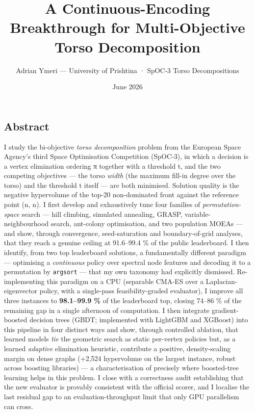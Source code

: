 \documentclass[
  11pt,
]{article}
\title{A Continuous-Encoding Breakthrough for Multi-Objective Torso
Decomposition}
\author{Adrian Ymeri --- University of Prishtina · SpOC-3 Torso
Decompositions}
\date{June 2026}
\begin{document}
\maketitle

{
\hypersetup{linkcolor=black}
\setcounter{tocdepth}{3}
\tableofcontents
}
\hypertarget{abstract}{%
\subsection{Abstract}\label{abstract}}

I study the bi-objective \emph{torso decomposition} problem from the
European Space Agency's third Space Optimisation Competition (SpOC-3),
in which a decision is a vertex elimination ordering π together with a
threshold t, and the two competing objectives --- the torso \emph{width}
(the maximum fill-in degree over the torso) and the threshold t itself
--- are both minimised. Solution quality is the negative hypervolume of
the top-20 non-dominated front against the reference point (n, n). I
first develop and exhaustively tune four families of
\emph{permutation-space} search --- hill climbing, simulated annealing,
GRASP, variable-neighbourhood search, ant-colony optimisation, and two
population MOEAs --- and show, through convergence, seed-saturation and
boundary-of-grid analyses, that they reach a genuine ceiling at
91.6--99.4 \% of the public leaderboard. I then identify, from two top
leaderboard solutions, a fundamentally different paradigm --- optimising
a \emph{continuous} policy over spectral node features and decoding it
to a permutation by \texttt{argsort} --- that my own taxonomy had
explicitly dismissed. Re-implementing this paradigm on a CPU (separable
CMA-ES over a Laplacian-eigenvector policy, with a single-pass
feasibility-graded evaluator), I improve all three instances to
\textbf{98.1--99.9 \%} of the leaderboard top, closing 74--86 \% of the
remaining gap in a single afternoon of computation. I then integrate
gradient-boosted decision trees (GBDT; implemented with LightGBM and
XGBoost) into this pipeline in four distinct ways and show, through
controlled ablation, that learned models \emph{tie} the geometric search
as static per-vertex policies but, as a learned \emph{adaptive}
elimination heuristic, contribute a positive, density-scaling margin on
dense graphs (+2,524 hypervolume on the largest instance, robust across
boosting libraries) --- a characterisation of precisely where
boosted-tree learning helps in this problem. I close with a correctness
audit establishing that the new evaluator is provably consistent with
the official scorer, and I localise the last residual gap to an
evaluation-throughput limit that only GPU parallelism can cross.
\end{document}
